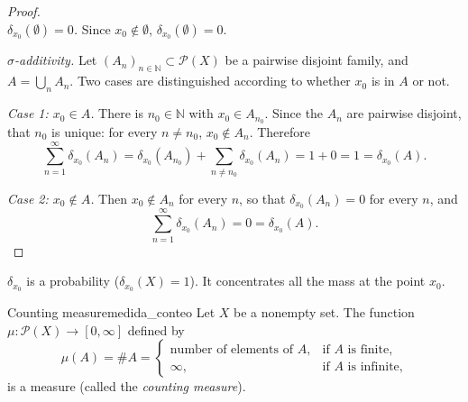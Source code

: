 \documentclass[11pt, a4paper]{article}
\begin{document}
\begin{proof}\leavevmode\\
\textit{$\delta_{x_0}(\emptyset) = 0$.} Since $x_0 \notin \emptyset$, $\delta_{x_0}(\emptyset) = 0$.

\textit{$\sigma$-additivity.} Let $(A_n)_{n \in \mathbb{N}} \subset \mathcal{P}(X)$ be a pairwise
disjoint family, and $A = \bigcup_{n} A_n$. Two cases are distinguished according to whether $x_0$ is in
$A$ or not.

\textit{Case 1: $x_0 \in A$.} There is $n_0 \in \mathbb{N}$ with $x_0 \in A_{n_0}$. Since the
$A_n$ are pairwise disjoint, that $n_0$ is unique: for every $n \ne n_0$, $x_0 \notin A_n$.
Therefore
$$ \sum_{n=1}^{\infty} \delta_{x_0}(A_n) = \delta_{x_0}(A_{n_0}) + \sum_{n \ne n_0}
\delta_{x_0}(A_n) = 1 + 0 = 1 = \delta_{x_0}(A). $$

\textit{Case 2: $x_0 \notin A$.} Then $x_0 \notin A_n$ for every $n$, so that
$\delta_{x_0}(A_n) = 0$ for every $n$, and
$$ \sum_{n=1}^{\infty} \delta_{x_0}(A_n) = 0 = \delta_{x_0}(A). $$
\end{proof}

\obs $\delta_{x_0}$ is a probability ($\delta_{x_0}(X) = 1$). It concentrates all the mass at the
point $x_0$.

\begin{proposicion}{Counting measure}{medida_conteo}
Let $X$ be a nonempty set. The function $\mu: \mathcal{P}(X) \to [0, \infty]$ defined by
$$ \mu(A) = \#A = \begin{cases} \text{number of elements of } A, & \text{if } A \text{ is finite,}
\\ \infty, & \text{if } A \text{ is infinite,} \end{cases} $$
is a measure (called the \emph{counting measure}).
\end{proposicion}
\end{document}
